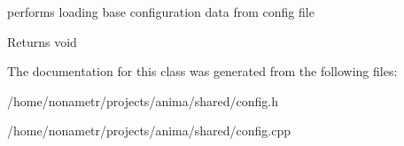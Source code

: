 performs loading base configuration data from config file 

\begin{DoxyReturn}{Returns}
void 
\end{DoxyReturn}


The documentation for this class was generated from the following files:\begin{DoxyCompactItemize}
\item 
/home/nonametr/projects/anima/shared/config.h\item 
/home/nonametr/projects/anima/shared/config.cpp\end{DoxyCompactItemize}
